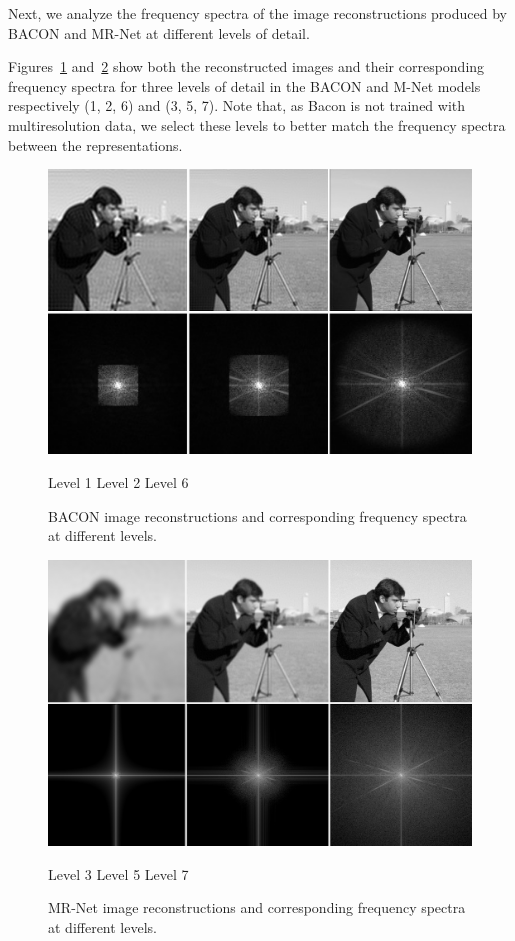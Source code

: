 Next, we analyze the frequency spectra of the image reconstructions produced by BACON and MR-Net at different levels of detail.

Figures~\ref{f:bacon} and~\ref{f:mnet} show both the reconstructed images and their corresponding frequency spectra for three levels of detail in the BACON and M-Net models respectively (1, 2, 6) and (3, 5, 7). Note that, as Bacon is not trained with multiresolution data, we select these levels to better match the frequency spectra between the representations.

\begin{figure}[!h]
\centering
\includegraphics[width=0.85\linewidth]{img/ch5/bacon-3.png}
\centerline{\small Level 1 \hfil Level 2 \hfil Level 6}
\caption{BACON image reconstructions and corresponding frequency spectra at different levels.}
\label{f:bacon}
\end{figure}

\begin{figure}[!h]
\centering
\includegraphics[width=0.85\linewidth]{img/ch5/m-net-3.png}
\centerline{\small Level 3 \hfil Level 5 \hfil Level 7}
\caption{MR-Net image reconstructions and corresponding frequency spectra at different levels.}
\label{f:mnet}
\end{figure}


